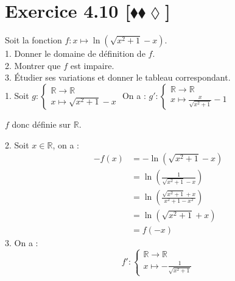 \documentclass[10pt]{article}
\begin{document}
\section*{Exercice 4.10 [$\blacklozenge\blacklozenge\lozenge$]}
\begin{tcolorbox}[enhanced, width=7in, center, size=fbox, fontupper=\large, drop shadow southwest]
    Soit la fonction $f:x\mapsto\ln\left(\sqrt{x^2+1}-x\right)$.\\
    1. Donner le domaine de définition de $f$.\\
    2. Montrer que $f$ est impaire.\\
    3. Étudier ses variations et donner le tableau correspondant.\\[0.25cm]
    1. Soit $g:\begin{cases}\mathbb{R}\rightarrow\mathbb{R}\\x\mapsto\sqrt{x^2+1}-x\end{cases}$ On a : $g':\begin{cases}\mathbb{R}\rightarrow\mathbb{R}\\x\mapsto\frac{x}{\sqrt{x^2+1}}-1\end{cases}$
    \begin{center}
    \end{center}
    $f$ donc définie sur $\mathbb{R}$.
\end{tcolorbox}

\begin{tcolorbox}[enhanced, width=7in, center, size=fbox, fontupper=\large, drop shadow southwest]
    2. Soit $x\in\mathbb{R}$, on a :
    \begin{align*}
        -f(x)&=-\ln\left(\sqrt{x^2+1}-x\right)\\
        &=\ln\left(\frac{1}{\sqrt{x^2+1}-x}\right)\\
        &=\ln\left(\frac{\sqrt{x^2+1}+x}{x^2+1-x^2}\right)\\
        &=\ln\left(\sqrt{x^2+1}+x\right)\\
        &=f(-x)
    \end{align*}
    3. On a :
    \begin{equation*}
        f':\begin{cases}\mathbb{R}\rightarrow\mathbb{R}\\x\mapsto-\frac{1}{\sqrt{x^2+1}}\end{cases}
    \end{equation*}
    \begin{center}
    \end{center}
\end{tcolorbox}
\end{document}

